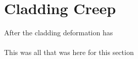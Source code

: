 \section{Cladding Creep}\label{cladding-creep}

After the cladding deformation has
\\
\\
{\color{red}This was all that was here for this section }
